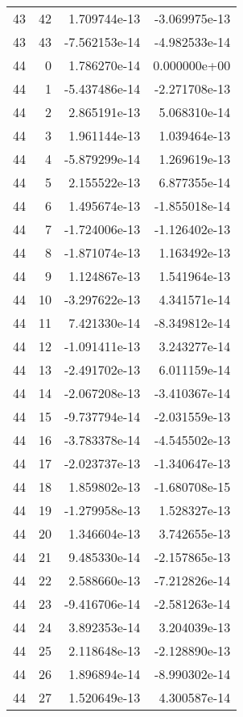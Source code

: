 \begin{tabular}{rrrr}
  43 &   42 &  1.709744e-13 & -3.069975e-13 \\
  43 &   43 & -7.562153e-14 & -4.982533e-14 \\
  44 &    0 &  1.786270e-14 &  0.000000e+00 \\
  44 &    1 & -5.437486e-14 & -2.271708e-13 \\
  44 &    2 &  2.865191e-13 &  5.068310e-14 \\
  44 &    3 &  1.961144e-13 &  1.039464e-13 \\
  44 &    4 & -5.879299e-14 &  1.269619e-13 \\
  44 &    5 &  2.155522e-13 &  6.877355e-14 \\
  44 &    6 &  1.495674e-13 & -1.855018e-14 \\
  44 &    7 & -1.724006e-13 & -1.126402e-13 \\
  44 &    8 & -1.871074e-13 &  1.163492e-13 \\
  44 &    9 &  1.124867e-13 &  1.541964e-13 \\
  44 &   10 & -3.297622e-13 &  4.341571e-14 \\
  44 &   11 &  7.421330e-14 & -8.349812e-14 \\
  44 &   12 & -1.091411e-13 &  3.243277e-14 \\
  44 &   13 & -2.491702e-13 &  6.011159e-14 \\
  44 &   14 & -2.067208e-13 & -3.410367e-14 \\
  44 &   15 & -9.737794e-14 & -2.031559e-13 \\
  44 &   16 & -3.783378e-14 & -4.545502e-13 \\
  44 &   17 & -2.023737e-13 & -1.340647e-13 \\
  44 &   18 &  1.859802e-13 & -1.680708e-15 \\
  44 &   19 & -1.279958e-13 &  1.528327e-13 \\
  44 &   20 &  1.346604e-13 &  3.742655e-13 \\
  44 &   21 &  9.485330e-14 & -2.157865e-13 \\
  44 &   22 &  2.588660e-13 & -7.212826e-14 \\
  44 &   23 & -9.416706e-14 & -2.581263e-14 \\
  44 &   24 &  3.892353e-14 &  3.204039e-13 \\
  44 &   25 &  2.118648e-13 & -2.128890e-13 \\
  44 &   26 &  1.896894e-14 & -8.990302e-14 \\
  44 &   27 &  1.520649e-13 &  4.300587e-14 \\

\end{tabular}
